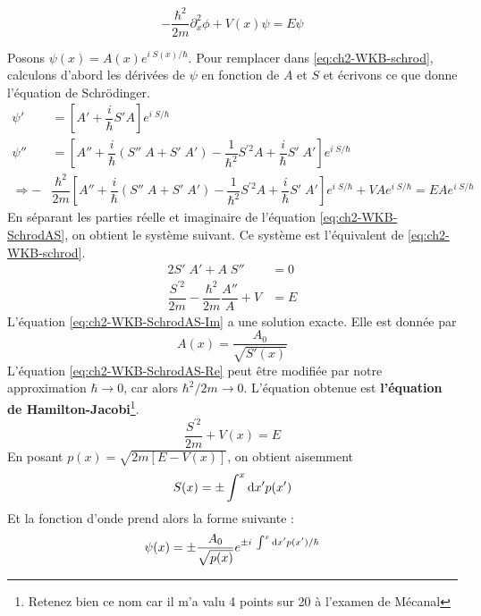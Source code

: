 \begin{equation}\label{eq:ch2-WKB-schrod}
  -\dfrac{\hbar^2}{2m} \partial_x ^2 \phi + V(x)\psi = E\psi
\end{equation}

Posons $\psi(x) = A(x) e^{i\; S(x)/\hbar}$. Pour remplacer dans \ref{eq:ch2-WKB-schrod}, calculons d'abord les dérivées de $\psi$ en fonction de $A$ et $S$ et écrivons ce que donne l'équation de Schrödinger.
\begin{align}
  \psi' &= \left[ A' + \dfrac{i}{\hbar} S' A\right]e^{i\; S/\hbar} \\
  \psi'' &= \left[A'' + \dfrac{i}{\hbar} (S''\; A + S'\; A') - \dfrac{1}{\hbar ^2} S^{\prime 2} A + \dfrac{i}{\hbar} S' \; A'\right] e ^{i\; S/\hbar} \\
  \Rightarrow -&\dfrac{\hbar ^2 }{2m} \left[A'' + \dfrac{i}{\hbar} (S''\; A + S'\; A') - \dfrac{1}{\hbar ^2} S^{\prime 2} A + \dfrac{i}{\hbar} S' \; A'\right] e ^{i\; S/\hbar} + VA e ^{i\; S/\hbar} = EA e ^{i\; S/\hbar} \label{eq:ch2-WKB-SchrodAS}
\end{align}
En séparant les parties réelle et imaginaire de l'équation \ref{eq:ch2-WKB-SchrodAS}, on obtient le système suivant. Ce système est l'équivalent de \ref{eq:ch2-WKB-schrod}.
\begin{align}
      2S' \; A' + A \; S'' &= 0 \label{eq:ch2-WKB-SchrodAS-Im} \\
      \dfrac{S^{\prime 2}}{2m} - \dfrac{\hbar ^2}{2m} \dfrac{A''}{A} + V &= E \label{eq:ch2-WKB-SchrodAS-Re} 
\end{align}
L'équation \ref{eq:ch2-WKB-SchrodAS-Im} a une solution exacte. Elle est donnée par 
\begin{equation}
  A(x) = \dfrac{A_0}{\sqrt{S'(x)}}
\end{equation}
L'équation \ref{eq:ch2-WKB-SchrodAS-Re} peut être modifiée par notre approximation $\hbar \longrightarrow 0$, car alors $\hbar ^2/2m \longrightarrow 0$. L'équation obtenue est \textbf{l'équation de Hamilton-Jacobi}\footnote{Retenez bien ce nom car il m'a valu 4 points sur 20 à l'examen de Mécanal}.
\begin{equation}
  \dfrac{S^{\prime 2}}{2m} + V(x) = E
\end{equation}
En posant $p(x) = \sqrt{2m[E - V(x)]}$, on obtient aisemment
\begin{equation}
  S(x) = \pm \int ^x \mathrm{d} x' p(x')
\end{equation}
Et la fonction d'onde prend alors la forme suivante :
\begin{equation} \label{eq:ch2-WKB-solution}
  \psi(x) = \pm \dfrac{A_0}{\sqrt{p(x)}} e^{\pm i \; \int ^x \mathrm{d} x' p(x')/\hbar}
\end{equation}


